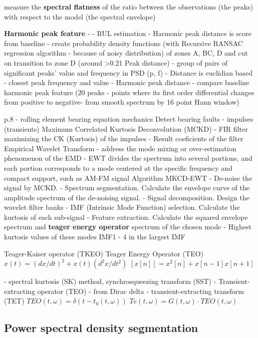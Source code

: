 \cite{lagrange_robust_2010}
measure the \textbf{spectral flatness} of the ratio between the observations (the peaks) with respect to the model (the spectral envelope)


\cite{jung_vibration_2017}
\textbf{Harmonic peak feature} - 
- RUL estimation - Harmonic peak distance is score from baseline - create probability density functions (with Recursive RANSAC regression algorithm - because of noisy distribution) of zones A,  BC, D
and cut on transition to zone D (around >0.21 Peak distance)
- group of pairs of significant peaks’ value and frequency in PSD (p, f)
- Distance is euclidian based - closest peak frequency and value
- Harmonic peak distance - compare baseline harmonic peak feature (20 peaks - points where its first order differential changes from positive to negative-  from smooth spectrum by 16 point Hann window) 


\cite{li_fault_2019}
p.8 - rolling element bearing equation mechanics
Detect bearing faults - impulses (transients)
Maximum Correlated Kurtosis Deconvolution (MCKD)
	- FIR filter maximizing the CK (Kurtosis) of the impulses - Result coeficients of the filter
Empirical Wavelet Transform 
	- address the mode mixing or over-estimation phenomenon of the EMD
	- EWT divides the spectrum into several portions, and each portion corresponds to a mode centered at the specific frequency and compact support, such as AM-FM signal
Algorithm MKCD-EWT
	- De-noise the signal by MCKD.
	- Spectrum segmentation. Calculate the envelope curve of the amplitude spectrum of the de-noising signal.
	- Signal decomposition. Design the wavelet filter banks
	- IMF (Intrinsic Mode Function) selection. Calculate the kurtosis of each sub-signal
	- Feature extraction. Calculate the squared envelope spectrum and \textbf{teager energy operator} spectrum of the chosen mode
- Highest kurtosis values of these modes IMF1 - 4 in the largest IMF

Teager-Kaiser operator (TKEO)
Teager Energy Operator (TEO)
$x(t)  = (dx/dt)^2+ x(t)(d^2x/dt^2) $
$[x[n]] = x^2[n] + x[n - 1]x[n + 1]$


\cite{yu_concentrated_2020}
- spectral kurtosis (SK) method, synchrosqueezing transform (SST)
- Transient-extracting operator (TEO) - from Dirac delta
- transient-extracting transform (TET)
$ TEO(t, \omega) = \delta(t − t_0(t, \omega))$
$ Te(t, \omega) = G(t, \omega) \cdot TEO(t, \omega) $ 

\subsection{Power spectral density segmentation}

